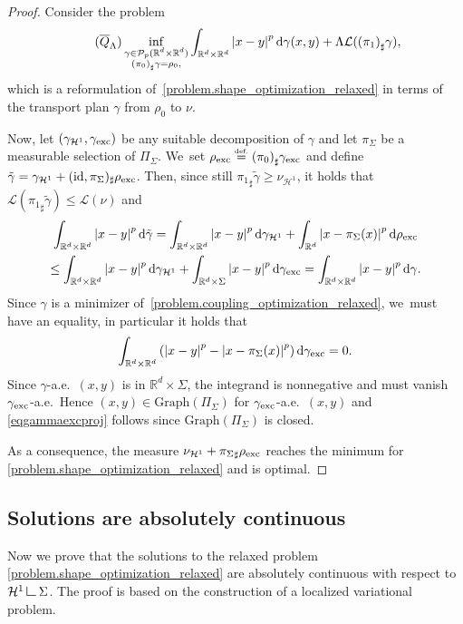 \documentclass[10pt]{amsart}
\theoremstyle{definition}
\newcommand{\eqdef}{\ensuremath{\stackrel{\mbox{\upshape\tiny def.}}{=}}}
\newcommand\LM[1]{\hbox{\vrule width.5pt \vbox to#1pt{\vfill \hrule width#1pt height.5pt}}}
\newcommand\LL{{\mathchoice {\>\LM7\>}{\>\LM7\>}{\,\LM5\,}{\,\LM{3.35}\,}}}
\newcommand{\mres}{\LL}
\newcommand\cH{\mathcal{H}}
\newcommand{\RR}{\mathbb{R}}
\newcommand{\nuH}{\nu_{\cH^1}}
\newcommand{\rhoexc}{\rho_{\textup{exc}}}
\newcommand{\gammaexc}{\gamma_{\textup{exc}}}
\newcommand{\gammaH}{\gamma_{\cH^1}}
\newcommand\dd{\mathrm{d}}
\newcommand{\abs}[1]{\left\lvert#1\right\rvert}
\begin{document}
\begin{proof}
Consider the problem\vspace*{-3pt}
\begin{align}
\label{problem.coupling_optimization_relaxed}
\tag{$\overline{Q}_\Lambda$}
\inf_{
\substack{
\gamma \in \mathcal{P}_p(\RR^d\times \RR^d)\\
{(\pi_{0})}_\sharp\gamma = \rho_0,
}
}
\int_{{\RR^d\times \RR^d}}\abs{x-y}^p\dd \gamma(x,y) + \Lambda \mathcal{L}({(\pi_{1})}_\sharp\gamma),
\end{align}
which is a reformulation of~\eqref{problem.shape_optimization_relaxed} in
terms of the transport plan $\gamma$ from $\rho_0$ to $\nu$.

Now, let $(\gammaH,\gammaexc)$ be any suitable decomposition of $\gamma$ and let $\pi_\Sigma$ be a measurable selection of $\Pi_\Sigma$. We~set $\rhoexc\eqdef {(\pi_{0})}_\sharp\gammaexc$ and define $\tilde{\gamma} = \gammaH + (\text{id},\pi_\Sigma)_{\sharp}\rhoexc$. Then,
since still ${\pi_1}_\sharp \tilde{\gamma}\ge \nu_{\cH^1}$,
it holds that $\mathcal{L}({\pi_{1}}_\sharp\tilde{\gamma})\leq \mathcal{L}(\nu)$ and
\begin{multline*}
\int_{{\RR^d\times \RR^d}}
\abs{x-y}^p\dd \tilde{\gamma}
= \int_{{\RR^d\times \RR^d}}
\abs{x-y}^p\dd \gammaH
+
\int_{\RR^d}
\abs{x-\pi_{\Sigma}(x)}^p\dd\rhoexc \\
\leq \int_{{\RR^d\times \RR^d}}\abs{x-y}^p\dd \gammaH+ \int_{\RR^d\times \Sigma}\abs{x-y}^p\dd\gammaexc = \int_{{\RR^d\times \RR^d}}\abs{x-y}^p\dd {\gamma}.
\end{multline*}
Since $\gamma$ is a minimizer of~\eqref{problem.coupling_optimization_relaxed}, we~must have an equality, in particular it holds that
\begin{equation*}
\int_{\RR^d\times \RR^d}\left( \abs{x-y}^p-\abs{x-\pi_{\Sigma}(x)}^p\right)\dd\gammaexc = 0.
\end{equation*}
Since $\gamma$-a.e.~$(x,y)$ is in $\RR^d\times \Sigma$, the integrand is nonnegative and must vanish $\gammaexc$-a.e.\ Hence $(x,y) \in \mathrm{Graph}(\Pi_\Sigma)$ for $\gammaexc$-a.e.\ $(x,y)$ and \eqref{eqgammaexcproj} follows since $\mathrm{Graph}(\Pi_\Sigma)$ is closed.

As a consequence, the measure $\nuH + {\pi_{\Sigma}}_\sharp\rhoexc$ reaches the minimum for \eqref{problem.shape_optimization_relaxed} and is optimal.
\end{proof}

\subsection{Solutions are absolutely continuous}
Now we prove
that the solutions to the relaxed problem \eqref{problem.shape_optimization_relaxed} are absolutely continuous with respect to $\cH^1\mres\Sigma$. The proof is based on the construction of a localized variational problem.
\end{document}
